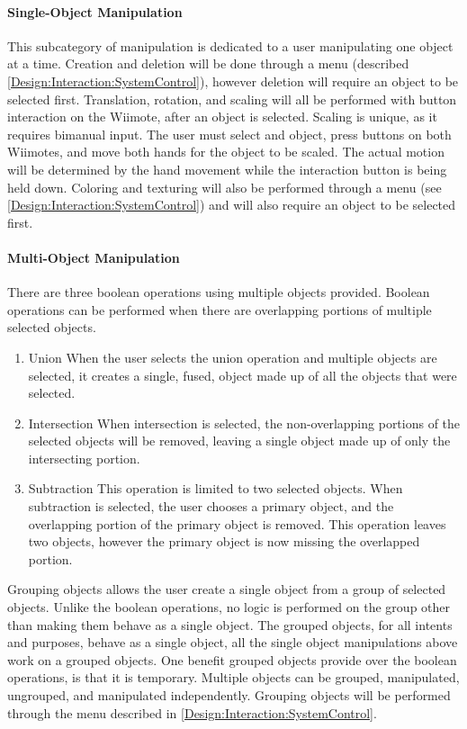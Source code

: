 \paragraph{Single-Object Manipulation}
This subcategory of manipulation is dedicated to a user manipulating one object at a time.
Creation and deletion will be done through a menu (described \ref{Design:Interaction:SystemControl}), however deletion will require an object to be selected first.
Translation, rotation, and scaling will all be performed with button interaction on the Wiimote, after an object is selected.
Scaling is unique, as it requires bimanual input.
The user must select and object, press buttons on both Wiimotes, and move both hands for the object to be scaled.
The actual motion will be determined by the hand movement while the interaction button is being held down.
Coloring and texturing will also be performed through a menu (see \ref{Design:Interaction:SystemControl}) and will also require an object to be selected first.

\paragraph{Multi-Object Manipulation}
There are three boolean operations using multiple objects provided.  Boolean operations can be performed when there are overlapping portions of multiple selected objects.
\begin{enumerate}
	\item Union
	\subitem When the user selects the union operation and multiple objects are selected, it creates a single, fused, object made up of all the objects that were selected.
	\item Intersection
	\subitem When intersection is selected, the non-overlapping portions of the selected objects will be removed, leaving a single object made up of only the intersecting portion.
	\item Subtraction
	\subitem This operation is limited to two selected objects.  When subtraction is selected, the user chooses a primary object, and the overlapping portion of the primary object is removed.  This operation leaves two objects, however the primary object is now missing the overlapped portion.
\end{enumerate}

Grouping objects allows the user create a single object from a group of selected objects.
Unlike the boolean operations, no logic is performed on the group other than making them behave as a single object.
The grouped objects, for all intents and purposes, behave as a single object, all the single object manipulations above work on a grouped objects.
One benefit grouped objects provide over the boolean operations, is that it is temporary.
Multiple objects can be grouped, manipulated, ungrouped, and manipulated independently.
Grouping objects will be performed through the menu described in \ref{Design:Interaction:SystemControl}.

